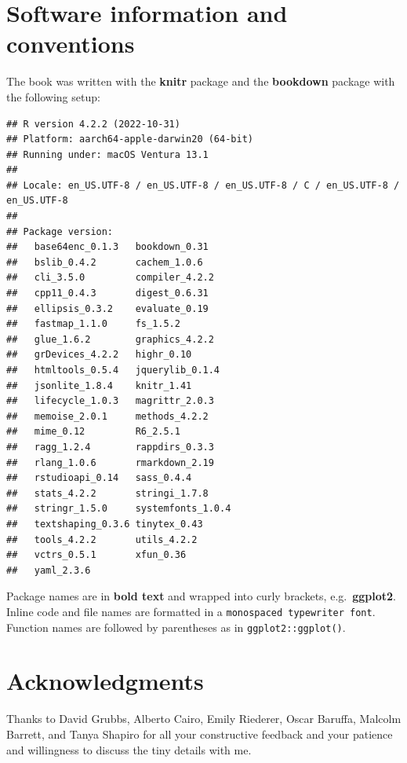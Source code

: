 \documentclass[
]{krantz}
\begin{document}
\hypertarget{software-information-and-conventions}{%
\section*{Software information and conventions}\label{software-information-and-conventions}}


The book was written with the \textbf{knitr} package \citep{xie2015} and the \textbf{bookdown} package \citep{R-bookdown} with the following setup:

\begin{verbatim}
## R version 4.2.2 (2022-10-31)
## Platform: aarch64-apple-darwin20 (64-bit)
## Running under: macOS Ventura 13.1
## 
## Locale: en_US.UTF-8 / en_US.UTF-8 / en_US.UTF-8 / C / en_US.UTF-8 / en_US.UTF-8
## 
## Package version:
##   base64enc_0.1.3   bookdown_0.31    
##   bslib_0.4.2       cachem_1.0.6     
##   cli_3.5.0         compiler_4.2.2   
##   cpp11_0.4.3       digest_0.6.31    
##   ellipsis_0.3.2    evaluate_0.19    
##   fastmap_1.1.0     fs_1.5.2         
##   glue_1.6.2        graphics_4.2.2   
##   grDevices_4.2.2   highr_0.10       
##   htmltools_0.5.4   jquerylib_0.1.4  
##   jsonlite_1.8.4    knitr_1.41       
##   lifecycle_1.0.3   magrittr_2.0.3   
##   memoise_2.0.1     methods_4.2.2    
##   mime_0.12         R6_2.5.1         
##   ragg_1.2.4        rappdirs_0.3.3   
##   rlang_1.0.6       rmarkdown_2.19   
##   rstudioapi_0.14   sass_0.4.4       
##   stats_4.2.2       stringi_1.7.8    
##   stringr_1.5.0     systemfonts_1.0.4
##   textshaping_0.3.6 tinytex_0.43     
##   tools_4.2.2       utils_4.2.2      
##   vctrs_0.5.1       xfun_0.36        
##   yaml_2.3.6
\end{verbatim}

Package names are in \textbf{bold text} and wrapped into curly brackets, e.g.~\textbf{ggplot2}. Inline code and file names are formatted in a \texttt{monospaced\ typewriter\ font}. Function names are followed by parentheses as in \texttt{ggplot2::ggplot()}.

\hypertarget{acknowledgments}{%
\section*{Acknowledgments}\label{acknowledgments}}


Thanks to David Grubbs, Alberto Cairo, Emily Riederer, Oscar Baruffa, Malcolm Barrett, and Tanya Shapiro for all your constructive feedback and your patience and willingness to discuss the tiny details with me.
\end{document}
